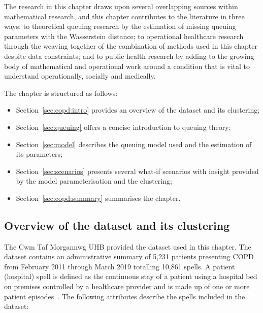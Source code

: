 The research in this chapter draws upon several overlapping sources within
mathematical research, and this chapter contributes to the literature in three
ways: to theoretical queuing research by the estimation of missing queuing
parameters with the Wasserstein distance; to operational healthcare research
through the weaving together of the combination of methods used in this chapter
despite data constraints; and to public health research by adding to the growing
body of mathematical and operational work around a condition that is vital to
understand operationally, socially and medically.

The chapter is structured as follows:

\begin{itemize}
    \item Section~\ref{sec:copd:intro} provides an overview of the dataset and
        its clustering;
    \item Section~\ref{sec:queuing} offers a concise introduction to queuing
        theory;
    \item Section~\ref{sec:model} describes the queuing model used and the
        estimation of its parameters;
    \item Section~\ref{sec:scenarios} presents several what-if scenarios with
        insight provided by the model parameterisation and the clustering;
    \item Section~\ref{sec:copd:summary} summarises the chapter.
\end{itemize}


\subsection{Overview of the dataset and its clustering}\label{subsec:overview}

The Cwm Taf Morgannwg UHB provided the dataset used in this chapter. The
dataset contains an administrative summary of 5,231 patients presenting COPD
from February 2011 through March 2019 totalling 10,861 spells. A patient
(hospital) spell is defined as the continuous stay of a patient using a hospital
bed on premises controlled by a healthcare provider and is made up of one or
more patient episodes~\cite{NHS:spell}. The following attributes describe the
spells included in the dataset:

